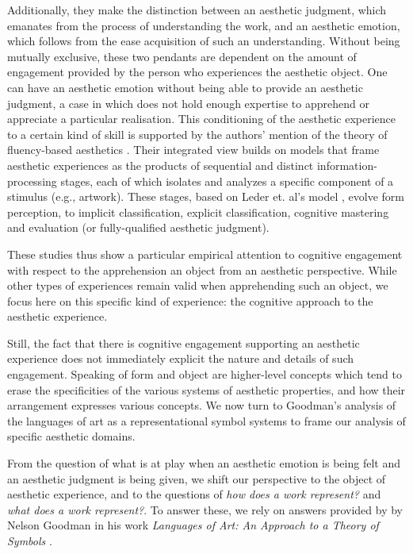 Additionally, they make the distinction between an aesthetic judgment, which emanates from the process of understanding the work, and an aesthetic emotion, which follows from the ease acquisition of such an understanding. Without being mutually exclusive, these two pendants are dependent on the amount of engagement provided by the person who experiences the aesthetic object. One can have an aesthetic emotion without being able to provide an aesthetic judgment,  a case in which does not hold enough expertise to apprehend or appreciate a particular realisation. This conditioning of the aesthetic experience to a certain kind of skill is supported by the authors' mention of the theory of fluency-based aesthetics \citep{chatterjee_neuroscience_2016}. Their integrated view builds on models that frame aesthetic experiences as the products of sequential and distinct information-processing stages, each of which isolates and analyzes a specific component of a stimulus (e.g., artwork). These stages, based on Leder et. al's model \citep{leder_model_2004}, evolve form perception, to implicit classification, explicit classification, cognitive mastering and evaluation (or fully-qualified aesthetic judgment).

These studies thus show a particular empirical attention to cognitive engagement with respect to the apprehension an object from an aesthetic perspective. While other types of experiences remain valid when apprehending such an object, we focus here on this specific kind of experience: the cognitive approach to the aesthetic experience.

Still, the fact that there is cognitive engagement supporting an aesthetic experience does not immediately explicit the nature and details of such engagement. Speaking of form and object are higher-level concepts which tend to erase the specificities of the various systems of aesthetic properties, and how their arrangement expresses various concepts. We now turn to Goodman's analysis of the languages of art as a representational symbol systems to frame our analysis of specific aesthetic domains.


From the question of what is at play when an aesthetic emotion is being felt and an aesthetic judgment is being given, we shift our perspective to the object of aesthetic experience, and to the questions of \emph{how does a work represent?} and \emph{what does a work represent?}. To answer these, we rely on answers provided by by Nelson Goodman in his work \emph{Languages of Art: An Approach to a Theory of Symbols} \citep{goodman_languages_1976}.

